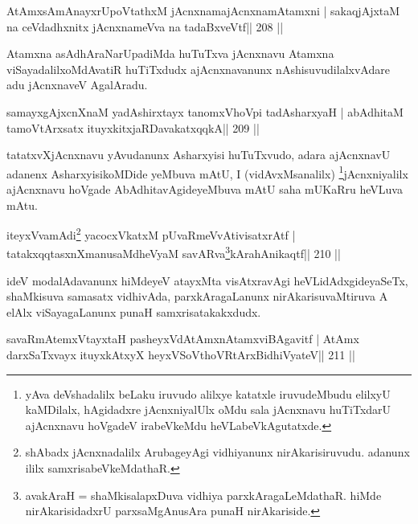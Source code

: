 
\begin{shl}
AtAmxsAmAnayxrUpoVtathxM jAcnxnamajAcnxnamAtamxni |
sakaqjAjxtaM na ceVdadhxnitx jAcnxnameVva na tadaBxveVtf\hfill || 208 ||
\end{shl}

\begin{artha}
Atamxna asAdhAraNarUpadiMda huTuTxva jAcnxnavu Atamxna viSayadalilx\break oMdAvatiR huTiTxdudx ajAcnxnavanunx nAshisuvudilalxvAdare adu jAcnxnaveV AgalAradu.
\end{artha}

\begin{shl}
samayxgAjxcnXnaM yadAshirxtayx tanomxVhoV\s pi tadAsharxyaH |
abAdhitaM tamoV\s tArx\s\s satx ituyxkitxjaRDavakatxqqkA\hfill || 209 ||
\end{shl}

\begin{artha}
tatatxvXjAcnxnavu yAvudanunx Asharxyisi huTuTxvudo, adara ajAcnxnavU adanenx AsharxyisikoMDide yeMbuva mAtU, I (vidAvxMsanalilx) \footnote{yAva deVshadalilx beLaku iruvudo alilxye katatxle iruvudeMbudu elilxyU kaMDilalx, hAgidadxre jAcnxniyalUlx oMdu sala jAcnxnavu huTiTxdarU ajAcnxnavu hoVgadeV irabeVkeMdu heVLabeVkAgutatxde.}jAcnxniyalilx ajAcnxnavu hoVgade AbAdhitavAgideyeMbuva mAtU saha mUKaRru heVLuva mAtu.
\end{artha}
\newpage
\begin{shl}
iteyxVvamAdi\footnote{shAbadx jAcnxnadalilx ArubageyAgi vidhiyanunx nirAkarisiruvudu. adanunx ililx samxrisabeVkeMdathaR.} yacocxVkatxM pUvaRmeVvAtivisatxrAtf |
tatakxqqtasxnXmanusaMdheVyaM savARva\footnote{avakAraH = shaMkisalapxDuva vidhiya parxkAragaLeMdathaR. hiMde nirAkarisidadxrU parxsaMgAnusAra punaH nirAkariside.}kArahAnikaqtf\hfill || 210 ||
\end{shl}

\begin{artha}
ideV modalAdavanunx hiMdeyeV atayxMta visAtxravAgi heVLidAdxgideyaSeTx, shaMkisuva samasatx vidhivAda, parxkAragaLanunx nirAkarisuvaMtiruva A elAlx viSayagaLanunx punaH samxrisatakakxdudx.
\end{artha}

\begin{shl}
savaRmAtemxVtayxtaH pasheyxVdAtAmxnAtamxviBAgavitf |
AtAmx darxSaTxvayx ituyxkAtxyX heyxVSoV\s thoVR\s tArxBidhiVyateV\hfill || 211 ||
\end{shl}

